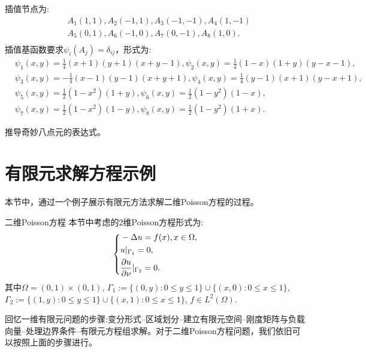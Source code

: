 插值节点为:
\begin{equation}
    \begin{aligned}
        &A_{1}(1,1),A_{2}(-1,1),A_{3}(-1,-1),A_{4}(1,-1)\\
        &A_{5}(0,1),A_{6}(-1,0),A_{7}(0,-1),A_{8}(1,0).\\
    \end{aligned}
\end{equation}
插值基函数要求$\psi_{i}(A_{j})=\delta_{ij}$，形式为:
\begin{equation}
    \begin{aligned}
        &\psi_{1}(x,y)=\frac{1}{4}(x+1)(y+1)(x+y-1),\psi_{2}(x,y)=\frac{1}{4}(1-x)(1+y)(y-x-1),\\
        &\psi_{3}(x,y)=-\frac{1}{4}(x-1)(y-1)(x+y+1),\psi_{4}(x,y)=\frac{1}{4}(y-1)(x+1)(y-x+1),\\
        &\psi_{5}(x,y)=\frac{1}{2}(1-x^2)(1+y),\psi_{6}(x,y)=\frac{1}{2}(1-y^2)(1-x),\\
        &\psi_{7}(x,y)=\frac{1}{2}(1-x^2)(1-y),\psi_{8}(x,y)=\frac{1}{2}(1-y^2)(1+x).
    \end{aligned}
\end{equation}
\begin{exercise}
    推导奇妙八点元的表达式。
\end{exercise}
\section{有限元求解方程示例}
本节中，通过一个例子展示有限元方法求解二维Poisson方程的过程。
\begin{definition}{二维Poisson方程}
    本节中考虑的2维Poisson方程形式为:
    \begin{equation}
        \label{eq:2Dpoisson}
        \left\{
        \begin{aligned}
            &-\Delta u=f(x),x\in\Omega,\\
            &u|_{\Gamma_{1}}=0,\\
            &\frac{\partial u}{\partial \nu}|_{\Gamma_{2}}=0.\\
        \end{aligned}
        \right.
    \end{equation}
    其中$\Omega=(0,1)\times(0,1)$, $\Gamma_{1}:=\{(0,y):0\le y\le 1\}\cup\{(x,0):0\le x\le 1\}$, $\Gamma_{2}:=\{(1,y):0\le y\le 1\}\cup\{(x,1):0\le x\le 1\}$, $f\in L^{2}(\Omega)$.
\end{definition}
回忆一维有限元问题的步骤:变分形式--区域划分--建立有限元空间--刚度矩阵与负载向量--处理边界条件--有限元方程组求解。对于二维Poisson方程问题，我们依旧可以按照上面的步骤进行。